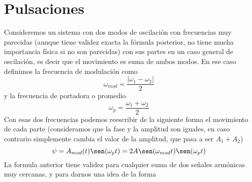 \documentclass[a4paper,spanish]{article}
\numberwithin{equation}{section}
\begin{document}
\section{Pulsaciones}

Consideremos un sistema con dos modos de oscilaci\'on con frecuencias muy parecidas (aunque tiene validez exacta la f\'ormula posterior, no tiene mucha importancia f\'isica si no son parecidas) con sus partes en un caso general de oscilaci\'on, es decir que el movimiento es suma de ambos modos. En ese caso definimos la frecuencia de modulaci\'on como
		\begin{equation}
			\omega_{mod} = \frac{|\omega_1 - \omega_2|}{2}
			\label{eq:oscilador_pulsaciones_modulacion}
		\end{equation}
		y la frecuencia de portadora o promedio
		\begin{equation}
			\omega_p = \frac{\omega_1 + \omega_2}{2}
			\label{eq:oscilador_pulsaciones_portadora}
		\end{equation}
		Con esas dos frecuencias podemos reescribir de la siguiente forma el movimiento de cada parte (consideramos que la fase y la amplitud son iguales, en caso contrario simplemente cambia el valor de la amplitud, que pasa a ser $A_1 + A_2$)
		\begin{equation}
			\psi = A_{mod}(t) \sen(\omega_p t) = 2 A \sen(\omega_{mod} t) \sen(\omega_p t)
			\label{eq:oscilador_pulsaciones}
		\end{equation}
		La formula anterior tiene validez para cualquier suma de dos se\~nales arm\'onicas muy cercanas, y para darnos una idea de la forma
		
\end{document}
